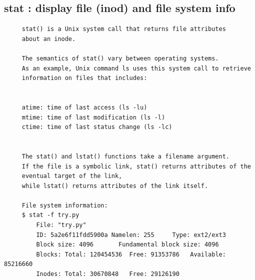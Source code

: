 \documentclass[a4paper,12pt]{article}
\begin{document}
\subsection{stat    : display file (inod) and file system info}
\begin{verbatim}
     stat() is a Unix system call that returns file attributes
     about an inode. 
     
     The semantics of stat() vary between operating systems. 
     As an example, Unix command ls uses this system call to retrieve
     information on files that includes:


     atime: time of last access (ls -lu)
     mtime: time of last modification (ls -l)
     ctime: time of last status change (ls -lc)
     
     
     The stat() and lstat() functions take a filename argument.
     If the file is a symbolic link, stat() returns attributes of the 
     eventual target of the link, 
     while lstat() returns attributes of the link itself. 
     
     File system information:   
     $ stat -f try.py 
         File: "try.py"
         ID: 5a2e6f11fdd5900a Namelen: 255     Type: ext2/ext3
         Block size: 4096       Fundamental block size: 4096
         Blocks: Total: 120454536  Free: 91353786   Available: 85216660
         Inodes: Total: 30670848   Free: 29126190
      
\end{verbatim}
\end{document}
